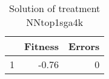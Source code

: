 \begin{table}[ht]
\centering
\begin{tabular}{rrr}
  \hline
 & Fitness & Errors \\ 
  \hline
1 & -0.76 &   0 \\ 
   \hline
\end{tabular}
\caption{Solution of treatment NNtop1sga4k} 
\end{table}
